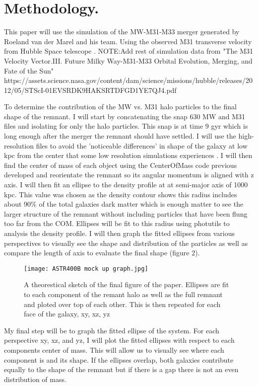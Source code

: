 \documentclass[fleqn,usenatbib]{mnras}
\begin{document}
\section{Methodology.}

This paper will use the simulation of the MW-M31-M33 merger generated by Roeland van der Marel and his team. Using the observed M31 transverse velocity from Hubble Space telescope \cite{web:Nasa:article}. NOTE:Add rest of simulation data from "The M31 Velocity Vector.III. Future Milky Way-M31-M33 Orbital Evolution, Merging, and Fate of the Sun" https://assets.science.nasa.gov/content/dam/science/missions/hubble/releases/2012/05/STScI-01EVSRDK9HAKSRTDFGD1YE7QJ4.pdf


To determine the contribution of the MW vs. M31 halo particles to the final shape of the remnant. I will start by concatenating the snap 630 MW and M31 files and isolating for only the halo particles. This snap is at time 9 gyr which is long enough after the merger the remnant should have settled. I will use the high-resolution files to avoid the 'noticeable differences' in shape of the galaxy at low kpc from the center that some low resolution simulations experiences \cite{10.1093/mnras/stz2873}. I will then find the center of mass of each object using the CenterOfMass code previous developed and reorientate the remnant so its angular momentum is aligned with z axis. I will then fit an ellipse to the density profile at at semi-major axis of 1000 kpc. This value was chosen as the density contour shows this radius includes about 90\% of the total galaxies dark matter which is enough matter to see the larger structure of the remnant without including particles that have been flung too far from the COM. Ellipses will be fit to this radius using photutils to analysis the density profile. I will then graph the fitted ellipses from various perspectives to visually see the shape and distribution of the particles as well as compare the length of axis to evaluate the final shape (figure 2). 
\begin{figure}
    \centering
    \texttt{[image: ASTR400B mock up graph.jpg]}
    \caption{A theorestical sketch of the final figure of the paper. Ellipses are fit to each component of the remant halo as well as the full remnant and ploted over top of each other. This is then repeated for each face of the galaxy, xy, xz, yz}
    \label{A Rough Sketch of Final Figure}
\end{figure}

My final step will be to graph the fitted ellipse of the system. For each perspective xy, xz, and yz, I will plot the fitted ellipses with respect to each components center of mass. This will allow us to visually see where each component is and its shape. If the ellipses overlap, both galaxies contribute equally to the shape of the remnant but if there is a gap there is not an even distribution of mass.
\end{document}
